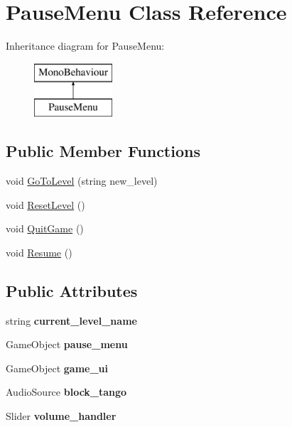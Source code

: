 \hypertarget{class_pause_menu}{}\section{Pause\+Menu Class Reference}
\label{class_pause_menu}
Inheritance diagram for Pause\+Menu\+:\begin{figure}[H]
\begin{center}
\leavevmode
\includegraphics[height=2.000000cm]{class_pause_menu}
\end{center}
\end{figure}
\subsection*{Public Member Functions}
\begin{DoxyCompactItemize}
\item 
void \mbox{\hyperlink{class_pause_menu_a4395036ff419068f189806d0762f755f}{Go\+To\+Level}} (string new\+\_\+level)
\item 
void \mbox{\hyperlink{class_pause_menu_a701999bbc15ddc71f197239875b55fda}{Reset\+Level}} ()
\item 
void \mbox{\hyperlink{class_pause_menu_a833077a2752465d59d0e7e5ad756b7ab}{Quit\+Game}} ()
\item 
void \mbox{\hyperlink{class_pause_menu_a4416b25e65dfadf57cd8657eaf94f7df}{Resume}} ()
\end{DoxyCompactItemize}
\subsection*{Public Attributes}
\begin{DoxyCompactItemize}
\item 
\mbox{\label{class_pause_menu_a8be7235280befb867392195d08452bbf}} 
string {\bfseries current\+\_\+level\+\_\+name}
\item 
\mbox{\label{class_pause_menu_a5bfdbb6794473729d546fb3bd25755ce}} 
Game\+Object {\bfseries pause\+\_\+menu}
\item 
\mbox{\label{class_pause_menu_a050f9ffa88ad4221e6c28cfa7d9d5eef}} 
Game\+Object {\bfseries game\+\_\+ui}
\item 
\mbox{\label{class_pause_menu_ae507f43045c7bba755731b3d300914cc}} 
Audio\+Source {\bfseries block\+\_\+tango}
\item 
\mbox{\label{class_pause_menu_a81ef7147d2b1d7ae2f879d84461b7966}} 
Slider {\bfseries volume\+\_\+handler}
\end{DoxyCompactItemize}


